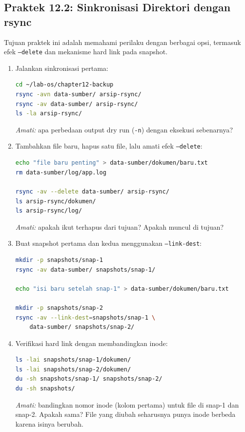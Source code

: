 \subsection*{Praktek 12.2: Sinkronisasi Direktori dengan rsync}

Tujuan praktek ini adalah memahami perilaku  dengan berbagai opsi,
termasuk efek \texttt{--delete} dan mekanisme hard link pada snapshot.

\begin{enumerate}
    \item Jalankan sinkronisasi pertama:
\begin{lstlisting}[language=bash, caption={Sinkronisasi pertama dengan rsync}]
cd ~/lab-os/chapter12-backup
rsync -avn data-sumber/ arsip-rsync/
rsync -av data-sumber/ arsip-rsync/
ls -la arsip-rsync/
\end{lstlisting}
    \textit{Amati:} apa perbedaan output dry run (\texttt{-n}) dengan eksekusi
    sebenarnya?

    \item Tambahkan file baru, hapus satu file, lalu amati efek \texttt{--delete}:
\begin{lstlisting}[language=bash, caption={Mengamati efek --delete pada rsync}]
echo "file baru penting" > data-sumber/dokumen/baru.txt
rm data-sumber/log/app.log

rsync -av --delete data-sumber/ arsip-rsync/
ls arsip-rsync/dokumen/
ls arsip-rsync/log/
\end{lstlisting}
    \textit{Amati:} apakah  ikut terhapus dari tujuan? Apakah
     muncul di tujuan?

    \item Buat snapshot pertama dan kedua menggunakan \texttt{--link-dest}:
\begin{lstlisting}[language=bash, caption={Membuat dua snapshot berbasis hard link}]
mkdir -p snapshots/snap-1
rsync -av data-sumber/ snapshots/snap-1/

echo "isi baru setelah snap-1" > data-sumber/dokumen/baru.txt

mkdir -p snapshots/snap-2
rsync -av --link-dest=snapshots/snap-1 \
    data-sumber/ snapshots/snap-2/
\end{lstlisting}

    \item Verifikasi hard link dengan membandingkan inode:
\begin{lstlisting}[language=bash, caption={Verifikasi hard link antar snapshot}]
ls -lai snapshots/snap-1/dokumen/
ls -lai snapshots/snap-2/dokumen/
du -sh snapshots/snap-1/ snapshots/snap-2/
du -sh snapshots/
\end{lstlisting}
    \textit{Amati:} bandingkan nomor inode (kolom pertama) untuk file 
    di snap-1 dan snap-2. Apakah sama? File \file{baru.txt} yang diubah
    seharusnya punya inode berbeda karena isinya berubah.


\end{enumerate}
